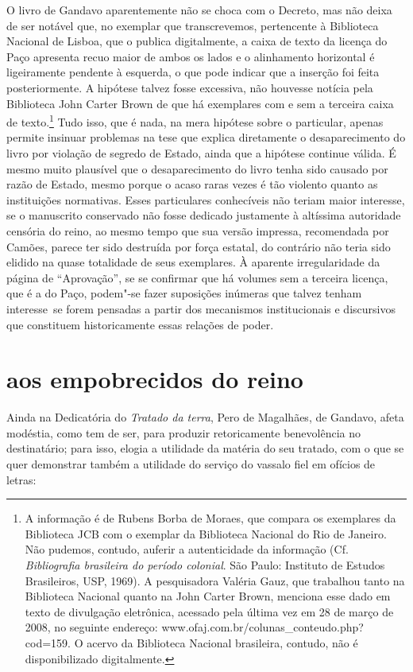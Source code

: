 O livro de Gandavo aparentemente não se choca com o Decreto, mas não
deixa de ser notável que, no exemplar que transcrevemos, pertencente à
Biblioteca Nacional de Lisboa, que o publica digitalmente, a caixa de
texto da licença do Paço apresenta recuo maior de ambos os lados e o
alinhamento horizontal é ligeiramente pendente à esquerda, o que pode
indicar que a inserção foi feita posteriormente. A hipótese talvez
fosse excessiva, não houvesse notícia pela Biblioteca John Carter Brown
de que há exemplares com e sem a terceira caixa de texto.\footnote{ A
informação é de Rubens Borba de Moraes, que compara os exemplares da
Biblioteca JCB com o exemplar da Biblioteca Nacional do Rio de Janeiro.
Não pudemos, contudo, auferir a autenticidade da informação (Cf.
\textit{Bibliografia brasileira do período colonial}. São Paulo: Instituto de
Estudos Brasileiros, USP, 1969). A pesquisadora Valéria Gauz, que
trabalhou tanto na Biblioteca Nacional quanto na John Carter Brown,
menciona esse dado em texto de divulgação eletrônica, acessado pela
última vez em 28 de março de 2008, no seguinte endereço:
www.ofaj.com.br/colunas\_conteudo.php?cod=159. 
O acervo da Biblioteca Nacional brasileira, contudo, não é
disponibilizado digitalmente.} Tudo isso, que é nada, na mera hipótese
sobre o particular, apenas permite insinuar problemas na tese que
explica diretamente o desaparecimento do livro por violação de segredo
de Estado, ainda que a hipótese continue válida. É mesmo muito
plausível que o desaparecimento do livro tenha sido causado por razão
de Estado, mesmo porque o acaso raras vezes é tão violento quanto as
instituições normativas. Esses particulares conhecíveis não teriam
maior interesse, se o manuscrito conservado não fosse dedicado
justamente à altíssima autoridade censória do reino, ao mesmo tempo que
sua versão impressa, recomendada por Camões, parece ter sido destruída
por força estatal, do contrário não teria sido elidido na quase
totalidade de seus exemplares. À aparente irregularidade da página de
``Aprovação'', se se confirmar que há volumes
sem a terceira licença, que é a do Paço, podem"-se fazer suposições
inúmeras que talvez tenham \mbox{interesse se} forem pensadas a partir dos
mecanismos institucionais e discursivos que constituem historicamente
essas relações de poder.

\section{aos empobrecidos do reino}

Ainda na Dedicatória do \textit{Tratado da terra}, Pero de Magalhães, de
Gandavo, afeta modéstia, como tem de ser, para produzir retoricamente
benevolência no destinatário; para isso, elogia a utilidade da matéria
do seu tratado, com o que se quer demonstrar também a utilidade do
serviço do vassalo fiel em ofícios de letras:

